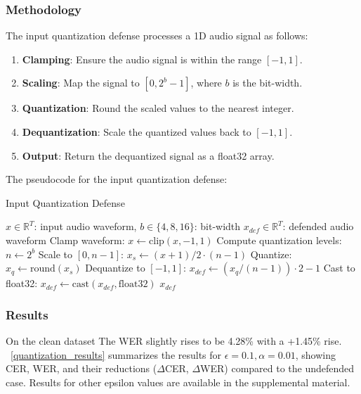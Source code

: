 \documentclass[../main.tex]{subfiles}
\begin{document}
\subsubsection{Methodology}
The input quantization defense processes a 1D audio signal as follows:
\begin{enumerate}
    \item \textbf{Clamping}: Ensure the audio signal is within the range $[-1, 1]$.
    \item \textbf{Scaling}: Map the signal to $[0, 2^b - 1]$, where $b$ is the bit-width.
    \item \textbf{Quantization}: Round the scaled values to the nearest integer.
    \item \textbf{Dequantization}: Scale the quantized values back to $[-1, 1]$.
    \item \textbf{Output}: Return the dequantized signal as a float32 array.
\end{enumerate}

The pseudocode for the input quantization defense:
\begin{breakablealgorithm}{Input Quantization Defense}
\begin{algorithmic}[1]
\Require $x \in \mathbb{R}^T$: input audio waveform, $b \in \{4, 8, 16\}$: bit-width
\Ensure $x_{def} \in \mathbb{R}^T$: defended audio waveform
\State Clamp waveform: $x \gets \text{clip}(x, -1, 1)$ 
\State Compute quantization levels: $n \gets 2^b$ 
\State Scale to $[0, n-1]$: $x_s \gets (x + 1) / 2 \cdot (n - 1)$ 
\State Quantize: $x_q \gets \text{round}(x_s)$ 
\State Dequantize to $[-1, 1]$: $x_{def} \gets (x_q / (n - 1)) \cdot 2 - 1$ 
\State Cast to float32: $x_{def} \gets \text{cast}(x_{def}, \text{float32})$ 
\State \Return $x_{def}$ 
\end{algorithmic}
\end{breakablealgorithm}


\subsubsection{Results}
 
On the clean dataset The WER slightly rises to be 4.28\% with a +1.45\% rise.
~\ref{quantization_results} summarizes the results for $\epsilon=0.1, \alpha=0.01$, showing CER, WER, and their reductions ($\Delta$CER, $\Delta$WER) compared to the undefended case. Results for other epsilon values are available in the supplemental material.
\end{document}
